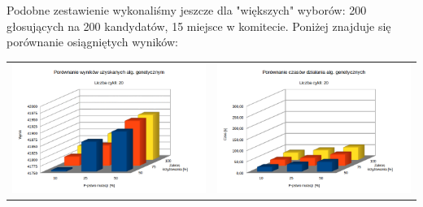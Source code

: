\documentclass[pdflatex,11pt]{../aghdoc_version2}
\begin{document}
\newpage

Podobne zestawienie wykonaliśmy jeszcze dla "większych" wyborów: 200 głosujących na 200 kandydatów, 15 miejsce w komitecie. Poniżej znajduje się porównanie osiągniętych wyników:

\begin{tabular}{cc}
	
\includegraphics[width=0.4\paperwidth]{pics/porownanie2/wynik20.png} & 
\includegraphics[width=0.4\paperwidth]{pics/porownanie2/czas20.png} \\
	

\end{tabular}
\end{document}
